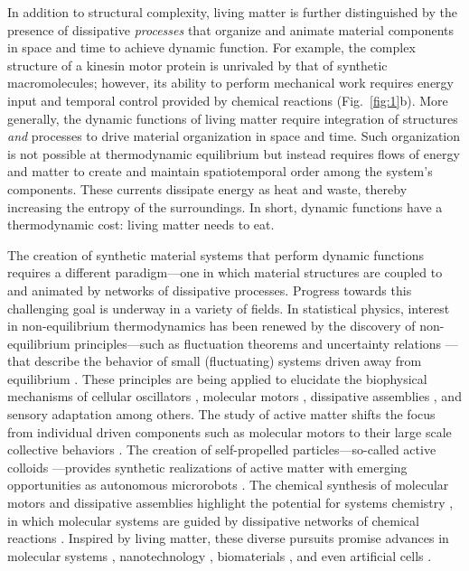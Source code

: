 \begin{appendices}
In addition to structural complexity, living matter is further distinguished by the presence of dissipative \emph{processes} that organize and animate material components in space and time to achieve dynamic function. For example, the complex structure of a kinesin motor protein is unrivaled by that of synthetic macromolecules; however, its ability to perform mechanical work requires energy input and temporal control provided by chemical reactions (Fig.~\ref{fig:1}b). More generally, the dynamic functions of living matter require integration of structures \emph{and} processes to drive material organization in space and time.  Such organization is not possible at thermodynamic equilibrium but instead requires flows of energy and matter to create and maintain spatiotemporal order among the system's components.  These currents dissipate energy as heat and waste, thereby increasing the entropy of the surroundings.  In short, dynamic functions have a thermodynamic cost: living matter needs to eat. 

The creation of synthetic material systems that perform dynamic functions requires a different paradigm---one in which material structures are coupled to and animated by networks of dissipative processes.  Progress towards this challenging goal is underway in a variety of fields.  In statistical physics, interest in non-equilibrium thermodynamics \autocite{de2013non} has been renewed by the discovery of non-equilibrium principles---such as fluctuation theorems \autocite{jarzynski2011equalities} and uncertainty relations \autocite{Seifert2018}---that describe the behavior of small (fluctuating) systems driven away from equilibrium \autocite{Seifert2012,Marsland2018}.  These principles are being applied to elucidate the biophysical mechanisms of cellular oscillators \autocite{Cao2015,Barato2016}, molecular motors \autocite{Pietzonka2016,Hess2017}, dissipative assemblies \autocite{Nguyen2015, marsland2018active}, and sensory adaptation \autocite{Lan2012,Tu2018} among others.  The study of active matter \autocite{Marchetti2013} shifts the focus from individual driven components such as molecular motors to their large scale collective behaviors \autocite{Needleman2017, Doostmohammadi2018}. The creation of self-propelled particles---so-called active colloids \autocite{Bechinger2016, illien2017fuelled, Zhang2017}---provides synthetic realizations of active matter with emerging opportunities as autonomous microrobots \autocite{Palagi2018, han2018engineering}. The chemical synthesis of molecular motors \autocite{kassem2017artificial,Astumian2017} and dissipative assemblies \autocite{VanRossum2017,De2018} highlight the potential for systems chemistry \autocite{Ashkenasy2017}, in which molecular systems are guided by dissipative networks of chemical reactions \autocite{Epstein2016, Grzybowski2017}. Inspired by living matter, these diverse pursuits promise advances in molecular systems \autocite{merindol2017materials}, nanotechnology \autocite{Grzybowski2016},  biomaterials \autocite{tibbitt2017living}, and even artificial cells \autocite{Yewdall2018}.


\end{appendices}
